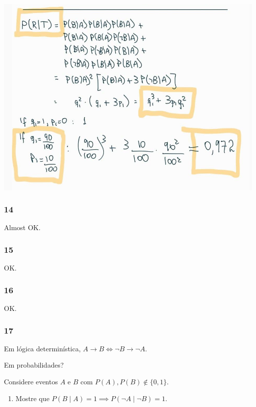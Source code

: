 \documentclass[
  11pt]{report}
\providecommand{\tightlist}{%
  \setlength{\itemsep}{0pt}\setlength{\parskip}{0pt}}
\begin{document}
\begin{itemize}
  \begin{center}\includegraphics[width=0.75\linewidth]{images/alice06} \end{center}
\end{itemize}

\hypertarget{section-13}{%
\subsubsection*{14}\label{section-13}}

Almost OK.

\hypertarget{section-14}{%
\subsubsection*{15}\label{section-14}}

OK.

\hypertarget{section-15}{%
\subsubsection*{16}\label{section-15}}

OK.

\hypertarget{section-16}{%
\subsubsection*{17}\label{section-16}}

\begin{rmdbox}

Em lógica determinística, $A \to B \iff \neg B \to \neg A$.

Em probabilidades?

Considere eventos $A$ e $B$ com $P(A), P(B) \not\in \{0, 1\}$.

\begin{enumerate}
\def\labelenumi{\alph{enumi}.}
\tightlist
\item
  Mostre que $P(B \mid A) = 1 \implies P(\neg A \mid \neg B) = 1$.
\end{enumerate}

\end{rmdbox}
\end{document}
